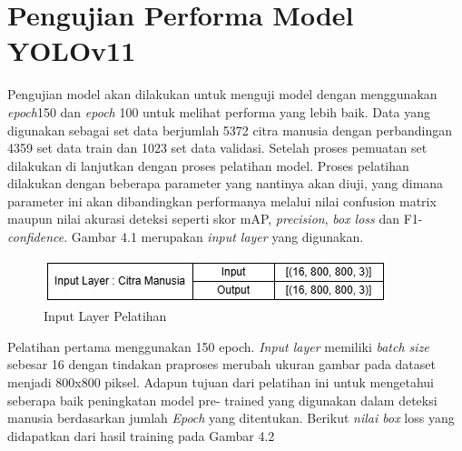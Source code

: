 \section{Pengujian Performa Model YOLOv11}
Pengujian model akan dilakukan untuk menguji model dengan menggunakan \emph{epoch}150 dan \emph{epoch} 100 untuk melihat performa yang lebih baik.
Data yang digunakan sebagai set data berjumlah 5372 citra manusia dengan perbandingan 4359 set data train dan 1023 set data validasi. Setelah proses pemuatan set dilakukan di lanjutkan dengan proses pelatihan model.
Proses pelatihan dilakukan dengan beberapa parameter yang nantinya akan diuji, yang dimana parameter ini akan dibandingkan performanya melalui nilai confusion matrix maupun nilai akurasi deteksi seperti skor mAP, \emph{precision}, \emph{box loss} dan F1-\emph{confidence}.
Gambar 4.1 merupakan \emph{input layer} yang digunakan.
\begin{figure} [H] \centering
  \includegraphics[scale=0.65]{gambar/Input layer.jpg}
  \caption{Input Layer Pelatihan}
  \label{fig:Pengujian Performa}
\end{figure}
Pelatihan pertama menggunakan 150 epoch. \emph{Input layer} memiliki \emph{batch size} sebesar 16 dengan tindakan praproses merubah ukuran gambar pada dataset menjadi 800x800 piksel. Adapun tujuan dari pelatihan ini untuk mengetahui seberapa baik peningkatan model pre- trained
yang digunakan dalam deteksi manusia berdasarkan jumlah \emph{Epoch} yang ditentukan. Berikut \emph{nilai box} loss yang didapatkan dari hasil training pada Gambar 4.2

